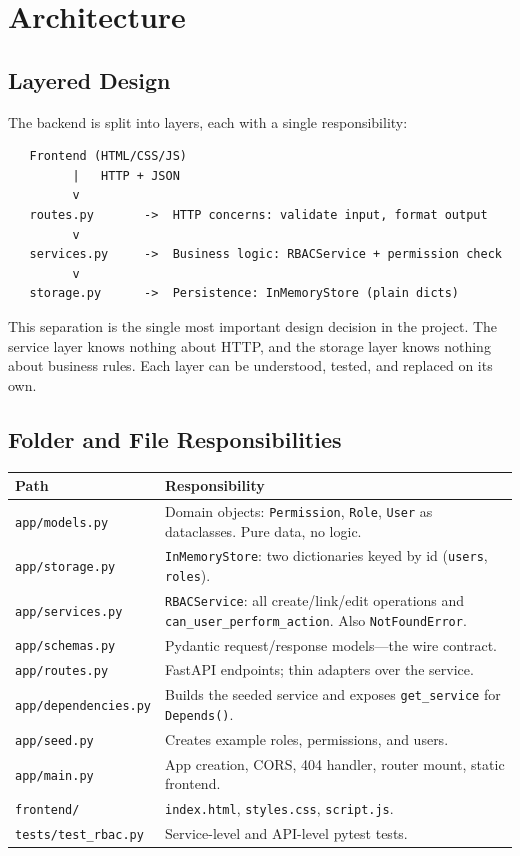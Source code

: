 \documentclass[11pt,a4paper]{report}
\begin{document}
\chapter{Architecture}

\section{Layered Design}

The backend is split into layers, each with a single responsibility:

\begin{verbatim}
   Frontend (HTML/CSS/JS)
         |   HTTP + JSON
         v
   routes.py       ->  HTTP concerns: validate input, format output
         v
   services.py     ->  Business logic: RBACService + permission check
         v
   storage.py      ->  Persistence: InMemoryStore (plain dicts)
\end{verbatim}

This separation is the single most important design decision in the project.
The service layer knows nothing about HTTP, and the storage layer knows nothing
about business rules. Each layer can be understood, tested, and replaced on its
own.

\section{Folder and File Responsibilities}

\begin{longtable}{p{} p{}}
\textbf{Path} & \textbf{Responsibility} \\
\hline
\endhead
\texttt{app/models.py} & Domain objects: \texttt{Permission}, \texttt{Role},
\texttt{User} as dataclasses. Pure data, no logic. \\
\texttt{app/storage.py} & \texttt{InMemoryStore}: two dictionaries keyed by id
(\texttt{users}, \texttt{roles}). \\
\texttt{app/services.py} & \texttt{RBACService}: all create/link/edit operations
and \texttt{can\_user\_perform\_action}. Also \texttt{NotFoundError}. \\
\texttt{app/schemas.py} & Pydantic request/response models---the wire contract. \\
\texttt{app/routes.py} & FastAPI endpoints; thin adapters over the service. \\
\texttt{app/dependencies.py} & Builds the seeded service and exposes
\texttt{get\_service} for \texttt{Depends()}. \\
\texttt{app/seed.py} & Creates example roles, permissions, and users. \\
\texttt{app/main.py} & App creation, CORS, 404 handler, router mount, static
frontend. \\
\texttt{frontend/} & \texttt{index.html}, \texttt{styles.css}, \texttt{script.js}. \\
\texttt{tests/test\_rbac.py} & Service-level and API-level pytest tests. \\
\end{longtable}
\end{document}
